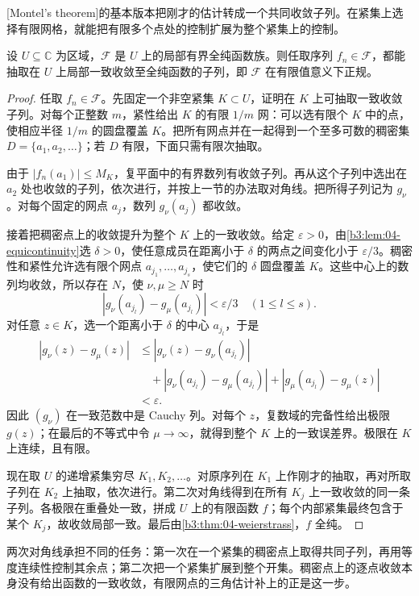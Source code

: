 [Montel's theorem]的基本版本把刚才的估计转成一个共同收敛子列。在紧集上选择有限网格，就能把有限多个点处的控制扩展为整个紧集上的控制。
\begin{theorem}\label{b3:thm:04-montel}
设 \(U\subseteq\mathbb C\) 为区域，\(\mathcal F\) 是 \(U\) 上的局部有界全纯函数族。则任取序列 \(f_n\in\mathcal F\)，都能抽取在 \(U\) 上局部一致收敛至全纯函数的子列，即 \(\mathcal F\) 在有限值意义下正规。
\end{theorem}
\begin{proof}
任取 \(f_n\in\mathcal F\)。先固定一个非空紧集 \(K\subset U\)，证明在 \(K\) 上可抽取一致收敛子列。对每个正整数 \(m\)，紧性给出 \(K\) 的有限 \(1/m\) 网：可以选有限个 \(K\) 中的点，使相应半径 \(1/m\) 的圆盘覆盖 \(K\)。把所有网点并在一起得到一个至多可数的稠密集 \(D=\{a_1,a_2,\ldots\}\)；若 \(D\) 有限，下面只需有限次抽取。

由于 \(|f_n(a_1)|\le M_K\)，复平面中的有界数列有收敛子列。再从这个子列中选出在 \(a_2\) 处也收敛的子列，依次进行，并按上一节的办法取对角线。把所得子列记为 \(g_\nu\)。对每个固定的网点 \(a_j\)，数列 \(g_\nu(a_j)\) 都收敛。

接着把稠密点上的收敛提升为整个 \(K\) 上的一致收敛。给定 \(\varepsilon>0\)，由\cref{b3:lem:04-equicontinuity}选 \(\delta>0\)，使任意成员在距离小于 \(\delta\) 的两点之间变化小于 \(\varepsilon/3\)。稠密性和紧性允许选有限个网点 \(a_{j_1},\ldots,a_{j_s}\)，使它们的 \(\delta\) 圆盘覆盖 \(K\)。这些中心上的数列均收敛，所以存在 \(N\)，使 \(\nu,\mu\ge N\) 时
\[
 |g_\nu(a_{j_l})-g_\mu(a_{j_l})|<\varepsilon/3
 \quad(1\le l\le s).
\]
对任意 \(z\in K\)，选一个距离小于 \(\delta\) 的中心 \(a_{j_l}\)，于是
\[
 \begin{aligned}
 |g_\nu(z)-g_\mu(z)|
 &\le |g_\nu(z)-g_\nu(a_{j_l})|\\
 &\quad+|g_\nu(a_{j_l})-g_\mu(a_{j_l})|
       +|g_\mu(a_{j_l})-g_\mu(z)|\\
 &<\varepsilon.
 \end{aligned}
\]
因此 \((g_\nu)\) 在一致范数中是 Cauchy 列。对每个 \(z\)，复数域的完备性给出极限 \(g(z)\)；在最后的不等式中令 \(\mu\to\infty\)，就得到整个 \(K\) 上的一致误差界。极限在 \(K\) 上连续，且有限。

现在取 \(U\) 的递增紧集穷尽 \(K_1,K_2,\ldots\)。对原序列在 \(K_1\) 上作刚才的抽取，再对所取子列在 \(K_2\) 上抽取，依次进行。第二次对角线得到在所有 \(K_j\) 上一致收敛的同一条子列。各极限在重叠处一致，拼成 \(U\) 上的有限函数 \(f\)；每个内部紧集最终包含于某个 \(K_j\)，故收敛局部一致。最后由\cref{b3:thm:04-weierstrass}，\(f\) 全纯。
\end{proof}
两次对角线承担不同的任务：第一次在一个紧集的稠密点上取得共同子列，再用等度连续性控制其余点；第二次把一个紧集扩展到整个开集。稠密点上的逐点收敛本身没有给出函数的一致收敛，有限网点的三角估计补上的正是这一步。

